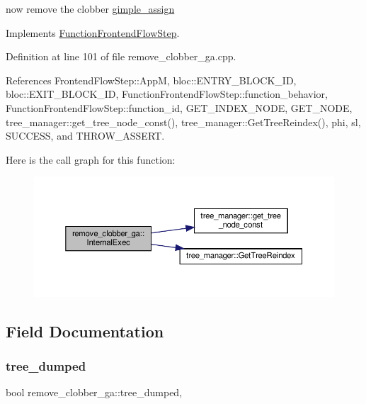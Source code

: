 now remove the clobber \hyperlink{structgimple__assign}{gimple\+\_\+assign} 

Implements \hyperlink{classFunctionFrontendFlowStep_a00612f7fb9eabbbc8ee7e39d34e5ac68}{Function\+Frontend\+Flow\+Step}.



Definition at line 101 of file remove\+\_\+clobber\+\_\+ga.\+cpp.



References Frontend\+Flow\+Step\+::\+AppM, bloc\+::\+E\+N\+T\+R\+Y\+\_\+\+B\+L\+O\+C\+K\+\_\+\+ID, bloc\+::\+E\+X\+I\+T\+\_\+\+B\+L\+O\+C\+K\+\_\+\+ID, Function\+Frontend\+Flow\+Step\+::function\+\_\+behavior, Function\+Frontend\+Flow\+Step\+::function\+\_\+id, G\+E\+T\+\_\+\+I\+N\+D\+E\+X\+\_\+\+N\+O\+DE, G\+E\+T\+\_\+\+N\+O\+DE, tree\+\_\+manager\+::get\+\_\+tree\+\_\+node\+\_\+const(), tree\+\_\+manager\+::\+Get\+Tree\+Reindex(), phi, sl, S\+U\+C\+C\+E\+SS, and T\+H\+R\+O\+W\+\_\+\+A\+S\+S\+E\+RT.

Here is the call graph for this function\+:
\nopagebreak
\begin{figure}[H]
\begin{center}
\leavevmode
\includegraphics[width=350pt]{d5/de8/classremove__clobber__ga_abea85b05a86d42b44170ab4919ac2476_cgraph}
\end{center}
\end{figure}


\subsection{Field Documentation}
\mbox{\label{classremove__clobber__ga_af02dd1c15ea8649ab34a24bde174968c}} 
\subsubsection{\texorpdfstring{tree\+\_\+dumped}{tree\_dumped}}
{\footnotesize\ttfamily bool remove\+\_\+clobber\+\_\+ga\+::tree\+\_\+dumped\hspace{0.3cm}{\ttfamily [static]}, {\ttfamily [private]}}




